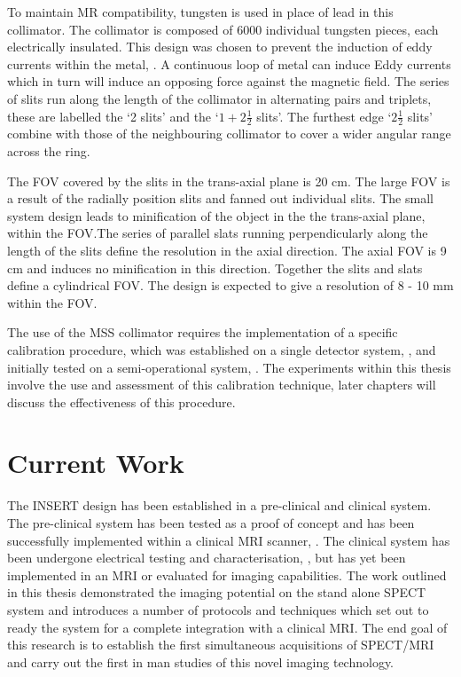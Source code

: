 To maintain \acrshort{MR} compatibility, tungsten is used in place of lead in this collimator. The collimator is composed of 6000 individual tungsten pieces, each electrically insulated. This design was chosen to prevent the induction of eddy currents within the metal, \cite{7286864}. A continuous loop of metal can induce Eddy currents which in turn will induce an opposing force against the magnetic field. The series of slits run along the length of the collimator in alternating pairs and triplets, these are labelled the `2 slits' and the `$1 + 2\frac{1}{2}$ slits'. The furthest edge `$2\frac{1}{2}$ slits'  combine with those of the neighbouring collimator to cover a wider angular range across the ring. 

The \acrshort{FOV} covered by the slits in the trans-axial plane is 20 cm. The large \acrshort{FOV} is a result of the radially position slits and fanned out individual slits. The small system design leads to minification of the object in the the trans-axial plane, within the \acrshort{FOV}.The series of parallel slats running perpendicularly along the length of the slits define the resolution in the axial direction. The axial \acrshort{FOV} is 9 cm and induces no minification in this direction. Together the slits and slats define a cylindrical \acrlong{FOV}. The design is expected to give a resolution of 8 - 10 mm within the \acrshort{FOV}. 

 The use of the MSS collimator requires the implementation of a specific calibration procedure, which was established on a single detector system, \cite{8340862}, and initially tested on a semi-operational system, \cite{inproceedings}. The experiments within this thesis involve the use and assessment of this calibration technique, later chapters will discuss the effectiveness of this procedure.

\section{Current Work}

The \acrshort{INSERT} design has been established in a pre-clinical and clinical system. The pre-clinical system has been tested as a proof of concept and has been successfully implemented within a clinical \acrshort{MRI} scanner, \cite{Carminati2018ExperimentalInsert}. The clinical system has been undergone electrical testing and characterisation, \cite{8432104}, but has yet been implemented in an \acrshort{MRI} or evaluated for imaging capabilities. The work outlined in this thesis demonstrated the imaging potential on the stand alone \acrshort{SPECT} system and introduces a number of protocols and techniques which set out to ready the system for a complete integration with a clinical \acrshort{MRI}. The end goal of this research is to establish the first simultaneous acquisitions of \acrshort{SPECT/MRI} and carry out the first in man studies of this novel imaging technology. 

















